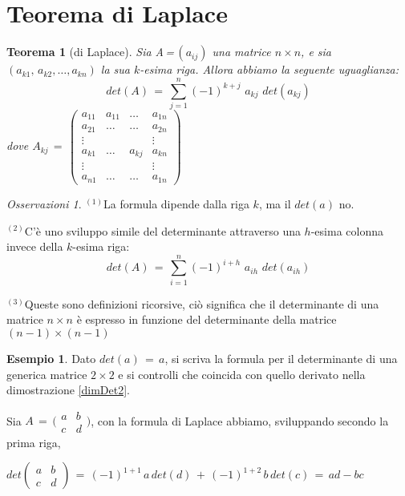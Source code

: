 \documentclass[a4paper]{report}
\newtheorem{teoremaDet}{Teorema}[section]
\theoremstyle{remark}
\newtheorem{oss}{Osservazioni}
\theoremstyle{definition}
\newtheorem{es}{Esempio}
\begin{document}
\section{Teorema di Laplace}
\label{laplace}

\begin{shaded}
	\begin{teoremaDet}[di Laplace]
	\label{Laplace}
		Sia A\,=\,$(a_{ij})$ una matrice $n \times n$, e sia $(a_{k1},\,a_{k2},\dots,a_{kn})$ la sua $k$-esima riga. Allora abbiamo la seguente uguaglianza:
		\[
		det(A)\,=\,\sum_{j=1}^n(-1)^{k+j}\,\,a_{kj}\,\,det(a_{kj})
		\]
		dove $A_{kj}\,=\,
		\begin{pmatrix}
		a_{11} & a_{11} & \dots & a_{1n}\\
		a_{21} & \dots & \dots & a_{2n}\\
		\vdots &  &  & \vdots\\
		a_{k1} & \dots & a_{kj} & a_{kn}\\
		\vdots &  &  & \vdots\\
		a_{n1} & \dots & \dots & a_{1n}
		\end{pmatrix}
		$
	\end{teoremaDet}
\end{shaded}
%
\begin{oss}
		$^{(1)}$La formula dipende dalla riga $k$, ma il $det(a)$ no.
		
		$^{(2)}$C'è uno sviluppo simile del determinante attraverso una $h$-esima colonna invece della $k$-esima riga:
		\[
		det(A)\,=\,\sum_{i=1}^n(-1)^{i+h}\,\,a_{ih}\,\,det(a_{ih})
		\]
		
		$^{(3)}$Queste sono definizioni ricorsive, ciò significa che il determinante di una matrice $n\times n$ è espresso in funzione del determinante della matrice $(n-1)\times(n-1)$
\end{oss}
\begin{es}
	Dato $det(a)\,=\,a$, si scriva la formula per il determinante di una generica matrice $2\times 2$ e si controlli che coincida con quello derivato nella dimostrazione \ref{dimDet2}.
	
	Sia $A\,=\,\bigl(
	\begin{smallmatrix}
	a & b\\
	c & d
	\end{smallmatrix}
	\bigr)$, con la formula di Laplace abbiamo, sviluppando secondo la prima riga,
	
	$det
	\begin{pmatrix}
	a & b\\
	c & d
	\end{pmatrix}\,=\,(-1)^{1+1}\,a\,det(d)\,+\,(-1)^{1+2}\,b\,det(c)\,=\,ad-bc$
\end{es}
\end{document}
